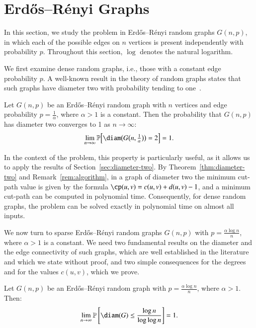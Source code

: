 \section{Erdős–Rényi Graphs}
\label{sec:random-graphs}

In this section, we study the \MinCutPath{} problem in Erdős–Rényi random graphs $G(n, p)$, in which each of the possible edges on $n$ vertices is present independently with probability $p$.
Throughout this section, $\log$ denotes the natural logarithm.

We first examine dense random graphs, i.e., those with a constant edge probability $p$.
A well-known result in the theory of random graphs states that such graphs have diameter two with probability tending to one~\cite{Bollobas2001}.

\begin{theorem}
\label{thm:random-diameter-two}
Let $G(n, p)$ be an Erdős–Rényi random graph with $n$ vertices and edge probability $p = \frac{1}{\alpha}$, where $\alpha > 1$ is a constant.
Then the probability that $G(n, p)$ has diameter two converges to 1 as $n \to \infty$:
\[
\lim_{n \to \infty} \mathbb{P}\!\left[\diam\bigl(G\bigl(n, \tfrac{1}{\alpha}\bigr)\bigr) = 2\right] = 1.
\]
\end{theorem}

In the context of the \MinCutPath{} problem, this property is particularly useful, as it allows us to apply the results of Section~\ref{sec:diameter-two}.
By Theorem~\ref{thm:diameter-two} and Remark~\ref{rem:algorithm}, in a graph of diameter two the minimum cut-path value is given by the formula $\cp(u, v) = c(u, v) + d(u, v) - 1$, and a minimum cut-path can be computed in polynomial time.
Consequently, for dense random graphs, the \MinCutPath{} problem can be solved exactly in polynomial time on almost all inputs.


We now turn to sparse Erdős–Rényi random graphs $G(n, p)$ with $p = \frac{\alpha \log n}{n}$, where $\alpha > 1$ is a constant.
We need two fundamental results on the diameter and the edge connectivity of such graphs, which are well established in the literature~\cite{Bollobas2001,Frieze2016} and which we state without proof, and two simple consequences for the degrees and for the values $c(u,v)$, which we prove.


\begin{theorem}
\label{thm:random-diameter}
Let $G(n, p)$ be an Erdős–Rényi random graph with $p = \frac{\alpha \log n}{n}$, where $\alpha > 1$. Then:
\[
\lim_{n\to\infty} \mathbb{P}\left[ \diam(G) \leq \frac{\log n}{\log \log n} \right] = 1.
\]
\end{theorem}


